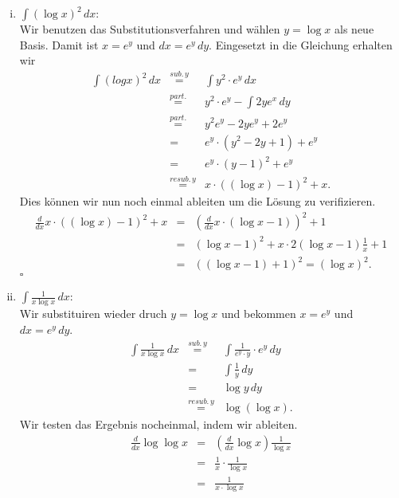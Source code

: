 \documentclass[11pt,a4paper,ngerman]{article}
\begin{document}
\begin{enumerate}[(i)]
	\item $\int (\log x)^2 \, dx$:\\
		Wir benutzen das Substitutionsverfahren und wählen $y = \log x$ als neue Basis. Damit ist $x = e^y$ und $dx = e^y \, dy$. 
		Eingesetzt in die Gleichung erhalten wir
		$$\begin{array}{rcl}
			\int (log x)^2 \, dx 	&\stackrel{sub. \, y}{=}& \int y^2 \cdot e^y \, dx\\
						&\stackrel{part.}{=}&  y^2\cdot e^y - \int 2ye^x \, dy\\
						&\stackrel{part.}{=}& y^2e^y  - 2ye^y + 2e^y\\
						&=& e^y \cdot (y^2 - 2y + 1) + e^y\\
						&=& e^y \cdot (y-1)^2 + e^y\\
						&\stackrel{resub. \, y}{=}& x \cdot ((\log x) - 1)^2 + x.
		\end{array}$$
		Dies können wir nun noch einmal ableiten um die Lösung zu verifizieren.
		$$\begin{array}{rcl}
			\frac{d}{dx} x \cdot ((\log x) - 1)^2 +x
							&=& (\frac{d}{dx} x \cdot (\log x - 1))^2 + 1\\
							&=& (\log x - 1)^2 + x \cdot 2 (\log x - 1) \frac {1}{x} + 1\\
							&=& ((\log x - 1) + 1)^2 = (\log x)^2.
		\end{array}$$
		\mbox{}\hfill $\square$

	\item $\int \frac{1}{x \log x} \, dx$:\\
		Wir substituiren wieder druch $y=\log x$ und bekommen $x=e^y$ und $dx = e^y \, dy$.
		$$\begin{array}{rcl}
			\int \frac{1}{x \log x} \, dx 
					&\stackrel{sub. \, y}{=}&	\int \frac{1}{e^y \cdot y} \cdot e^y \, dy\\
					&=& \int \frac{1}{y} \, dy\\
					&=& \log y \, dy\\
					&\stackrel{resub. \, y}{=}& \log (\log x).
		\end{array}$$
		Wir testen das Ergebnis nocheinmal, indem wir ableiten.
		$$\begin{array}{rcl}
			\frac{d}{dx} \log \log x &=& (\frac{d}{dx} \log x) \frac{1}{\log x}\\
				&=& \frac{1}{x} \cdot \frac{1}{\log x}\\
				&=& \frac{1}{x \cdot \log x}
		\end{array}$$
\pagebreak


\end{enumerate}
\end{document}
